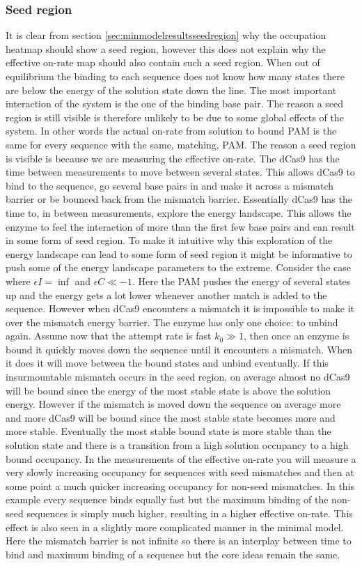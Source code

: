 \subsubsection{Seed region}
It is clear from section \ref{sec:minmodelresultsseedregion} why the occupation heatmap should show a seed region, however this does not explain why the effective on-rate map should also contain such a seed region. When out of equilibrium the binding to each sequence does not know how many states there are below the energy of the solution state down the line. The most important interaction of the system is the one of the binding base pair. The reason a seed region is still visible is therefore unlikely to be due to some global effects of the system. In other words the actual on-rate from solution to bound PAM is the same for every sequence with the same, matching, PAM. The reason a seed region is visible is because we are measuring the effective on-rate. The dCas9 has the time between measurements to move between several states. This allows dCas9 to bind to the sequence, go several base pairs in and make it across a mismatch barrier or be bounced back from the mismatch barrier. Essentially dCas9 has the time to, in between measurements, explore the energy landscape. This allows the enzyme to feel the interaction of more than the first few base pairs and can result in some form of seed region. To make it intuitive why this exploration of the energy landscape can lead to some form of seed region it might be informative to push some of the energy landscape parameters to the extreme. Consider the case where $\epsilon I = \inf$ and $\epsilon C \ll -1$. Here the PAM pushes the energy of several states up and the energy gets a lot lower whenever another match is added to the sequence. However when dCas9 encounters a mismatch it is impossible to make it over the mismatch energy barrier. The enzyme has only one choice: to unbind again. Assume now that the attempt rate is fast $k_0 \gg 1$, then once an enzyme is bound it quickly moves down the sequence until it encounters a mismatch. When it does it will move between the bound states and unbind eventually. If this insurmountable mismatch occurs in the seed region, on average almost no dCas9 will be bound since the energy of the most stable state is above the solution energy. However if the mismatch is moved down the sequence on average more and more dCas9 will be bound since the most stable state becomes more and more stable. Eventually the most stable bound state is more stable than the solution state and there is a transition from a high solution occupancy to a high bound occupancy. In the measurements of the effective on-rate you will measure a very slowly increasing occupancy for sequences with seed mismatches and then at some point a much quicker increasing occupancy for non-seed mismatches. In this example every sequence binds equally fast but the maximum binding of the non-seed sequences is simply much higher, resulting in a higher effective on-rate. This effect is also seen in a slightly more complicated manner in the minimal model. Here the mismatch barrier is not infinite so there is an interplay between time to bind and maximum binding of a sequence but the core ideas remain the same.


